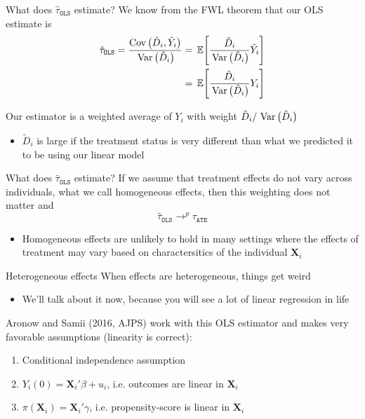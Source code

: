 \documentclass[aspectratio=169,t,11pt,table]{beamer}
\begin{document}
\begin{frame}{What does $\hat{\tau}_{\texttt{OLS}}$ estimate?}
  We know from the FWL theorem that our OLS estimate is 
  \begin{align*}
    \hat{\tau}_{\texttt{OLS}} 
    = \frac{\cov{\tilde{D}_i, \tilde{Y}_i}}{\var{\tilde{D}_i}} 
    &= \expec{\frac{\tilde{D}_i}{\var{\tilde{D}_i}} \tilde{Y}_i} \\
    &= \expec{\frac{\tilde{D}_i}{\var{\tilde{D}_i}} Y_i}
  \end{align*}
  
  \pause
  Our estimator is a weighted average of $Y_i$ with weight $\tilde{D}_i / \var{\tilde{D}_i}$
  \begin{itemize}
    \item $\tilde{D}_i$ is large if the treatment status is very different than what we predicted it to be using our linear model
  \end{itemize}
\end{frame}

\begin{frame}{What does $\hat{\tau}_{\texttt{OLS}}$ estimate?}
  If we assume that treatment effects do not vary across individuals, what we call \alert{homogeneous effects}, then this weighting does not matter and 
  $$
    \hat{\tau}_{\texttt{OLS}} \to^p \tau_{\texttt{ATE}}
  $$
  \pause
  \begin{itemize}
    \item Homogeneous effects are unlikely to hold in many settings where the effects of treatment may vary based on charactersitics of the individual $\bm{X}_i$  
  \end{itemize}
\end{frame}

\begin{frame}{Heterogeneous effects}
  When effects are heterogeneous, things get weird
  \begin{itemize}
    \item We'll talk about it now, because you will see a lot of linear regression in life
  \end{itemize}

  \bigskip
  \pause
  Aronow and Samii (2016, AJPS) work with this OLS estimator and makes very favorable assumptions (linearity is correct):
  \begin{enumerate}
    \item Conditional independence assumption
    
    \item $Y_i(0) = \bm{X}_i' \beta + u_i$, i.e. outcomes are linear in $\bm{X}_i$
    
    \item $\pi(\bm{X}_i) = \bm{X}_i' \gamma$, i.e. propensity-score is linear in $\bm{X}_i$
  \end{enumerate}
\end{frame}
\end{document}
